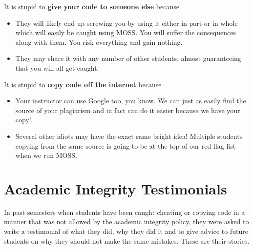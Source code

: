 \documentclass[12pt]{scrartcl}
\begin{document}
It is stupid to \textbf{give your code to someone else} because
\begin{itemize}
  \item They will likely end up screwing you by using it either in part or in whole which will easily be caught using MOSS.  You will suffer the consequences along with them.  You risk everything and gain nothing.
  \item They may share it with any number of other students, almost guaranteeing that you will all get caught.
\end{itemize}

It is stupid to \textbf{copy code off the internet} because
\begin{itemize}
  \item Your instructor can use Google too, you know.  We can just as easily find the source of your plagiarism and in fact can do it easier because we have your copy!
  \item Several other idiots may have the exact same bright idea!  Multiple students copying from the same source is going to be at the top of our red flag list when we run MOSS.
\end{itemize}

\newpage
\section*{Academic Integrity Testimonials}

In past semesters when students have been caught cheating or copying code in
a manner that was not allowed by the academic integrity policy, they were asked
to write a testimonial of what they did, why they did it and to give advice
to future students on why they should not make the same mistakes.  These
are their stories.
\end{document}
